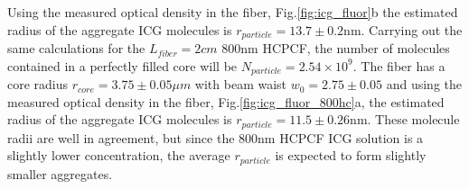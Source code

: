 Using the measured optical density in the fiber, Fig.\ref{fig:icg_fluor}b the estimated radius of the aggregate ICG molecules is $r_{particle} = 13.7 \pm 0.2$nm.
Carrying out the same calculations for the $L_{fiber}=2cm$ 800nm HCPCF, the number of molecules contained in a perfectly filled core will be $N_{particle}=2.54\times10^9$.  The fiber has a core radius $r_{core} = 3.75 \pm0.05\mu m$ with beam waist $w_0 = 2.75 \pm 0.05$ and using the measured optical density in the fiber, Fig.\ref{fig:icg_fluor_800hc}a, the estimated radius of the aggregate ICG molecules is $r_{particle} = 11.5 \pm 0.26$nm. These molecule radii are well in agreement, but since the 800nm HCPCF ICG solution is a slightly lower concentration, the average $r_{particle}$ is expected to form slightly smaller aggregates.

\clearpage